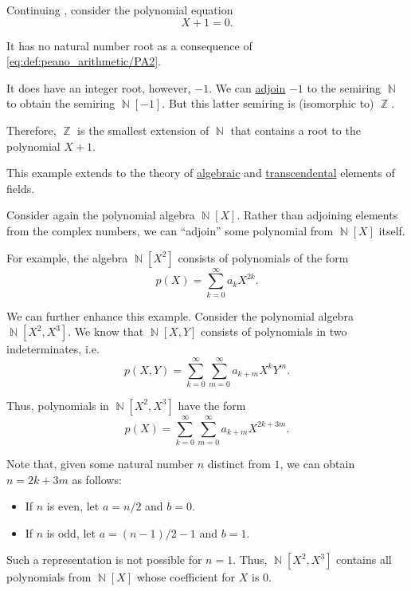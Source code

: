 \begin{example}\label{ex:adjoining_root}
  Continuing , consider the polynomial equation
  \begin{equation*}
    X + 1 = 0.
  \end{equation*}

  It has no natural number root as a consequence of \eqref{eq:def:peano_arithmetic/PA2}.

  It does have an integer root, however, \( -1 \). We can \hyperref[def:semiring_adjunction]{adjoin} \( -1 \) to the semiring \( \BbbN \) to obtain the semiring \( \BbbN[-1] \). But this latter semiring is (isomorphic to) \( \BbbZ \).

  Therefore, \( \BbbZ \) is the smallest extension of \( \BbbN \) that contains a root to the polynomial \( X + 1 \).

  This example extends to the theory of \hyperref[def:algebraic_element]{algebraic} and \hyperref[def:transcendental_element]{transcendental} elements of fields.
\end{example}

\begin{example}\label{ex:adjoining_polynomial}
  Consider again the polynomial algebra \( \BbbN[X] \). Rather than adjoining elements from the complex numbers, we can \enquote{adjoin} some polynomial from \( \BbbN[X] \) itself.

  For example, the algebra \( \BbbN[X^2] \) consists of polynomials of the form
  \begin{equation*}
    p(X) = \sum_{k=0}^\infty a_k X^{2k}.
  \end{equation*}

  We can further enhance this example. Consider the polynomial algebra \( \BbbN[X^2, X^3] \). We know that \( \BbbN[X, Y] \) consists of polynomials in two indeterminates, i.e.
  \begin{equation*}
    p(X, Y) = \sum_{k=0}^\infty \sum_{m=0}^\infty a_{k+m} X^k Y^m.
  \end{equation*}

  Thus, polynomials in \( \BbbN[X^2, X^3] \) have the form
  \begin{equation*}
    p(X) = \sum_{k=0}^\infty \sum_{m=0}^\infty a_{k+m} X^{2k + 3m}.
  \end{equation*}

  Note that, given some natural number \( n \) distinct from \( 1 \), we can obtain \( n = 2k + 3m \) as follows:
  \begin{itemize}
    \item If \( n \) is even, let \( a = n / 2 \) and \( b = 0 \).
    \item If \( n \) is odd, let \( a = (n - 1) / 2 - 1 \) and \( b = 1 \).
  \end{itemize}

  Such a representation is not possible for \( n = 1 \). Thus, \( \BbbN[X^2, X^3] \) contains all polynomials from \( \BbbN[X] \) whose coefficient for \( X \) is \( 0 \).
\end{example}

